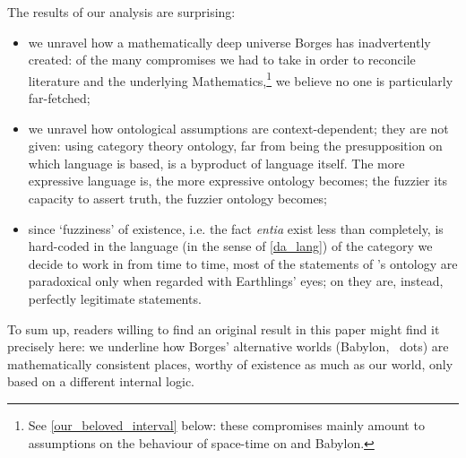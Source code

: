 The results of our analysis are surprising:
\begin{itemize}
	\item we unravel how a mathematically deep universe Borges has inadvertently created: of the many compromises we had to take in order to reconcile literature and the underlying Mathematics,\footnote{See \autoref{our_beloved_interval} below: these compromises mainly amount to assumptions on the behaviour of space-time on \tlon and Babylon.} we believe no one is particularly far-fetched;
	\item we unravel how ontological assumptions are context-dependent; they are not given: using category theory ontology, far from being the presupposition on which language is based, is a byproduct of language itself. The more expressive language is, the more expressive ontology becomes; the fuzzier its capacity to assert truth, the fuzzier ontology becomes;
	\item since `fuzziness' of existence, i.e. the fact \emph{entia} exist less than completely, is hard-coded in the language (in the sense of \autoref{da_lang}) of the category we decide to work in from time to time, most of the statements of \tlon's ontology are paradoxical only when regarded with Earthlings' eyes; on \tlon they are, instead, perfectly legitimate statements.
\end{itemize}
To sum up, readers willing to find an original result in this paper might find it precisely here: we underline how Borges' alternative worlds (Babylon, \tlon \ dots) are mathematically consistent places, worthy of existence as much as our world, only based on a different internal logic.

